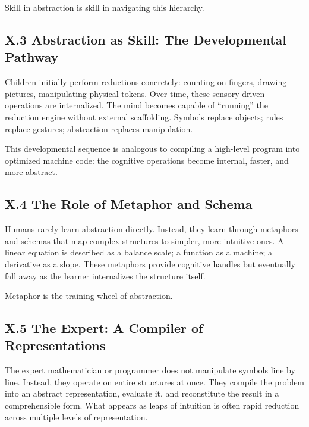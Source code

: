 \documentclass[12pt,letterpaper]{article}
\begin{document}
Skill in abstraction is skill in navigating this hierarchy.

\subsection{X.3 Abstraction as Skill: The Developmental Pathway}

Children initially perform reductions concretely: counting on fingers, drawing pictures, manipulating physical tokens. Over time, these sensory-driven operations are internalized. The mind becomes capable of ``running'' the reduction engine without external scaffolding. Symbols replace objects; rules replace gestures; abstraction replaces manipulation.

This developmental sequence is analogous to compiling a high-level program into optimized machine code: the cognitive operations become internal, faster, and more abstract.

\subsection{X.4 The Role of Metaphor and Schema}

Humans rarely learn abstraction directly. Instead, they learn through metaphors and schemas that map complex structures to simpler, more intuitive ones. A linear equation is described as a balance scale; a function as a machine; a derivative as a slope. These metaphors provide cognitive handles but eventually fall away as the learner internalizes the structure itself.

Metaphor is the training wheel of abstraction.

\subsection{X.5 The Expert: A Compiler of Representations}

The expert mathematician or programmer does not manipulate symbols line by line. Instead, they operate on entire structures at once. They compile the problem into an abstract representation, evaluate it, and reconstitute the result in a comprehensible form. What appears as leaps of intuition is often rapid reduction across multiple levels of representation.
\end{document}
